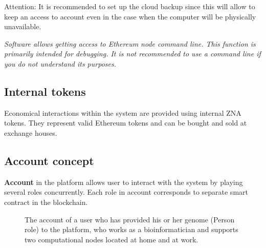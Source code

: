 \begin{note}
  Attention: It is recommended to set up the cloud backup since this will allow to keep an access to account even in the case when the computer will be physically unavailable.
\end{note}

\begin{note} \it
Software allows getting access to Ethereum node command line. This function is primarily intended for debugging. It is not recommended to use a command line if you do not understand its purposes.
\end{note}

\subsection{Internal tokens}
Economical interactions within the system are provided using internal ZNA tokens. They represent valid Ethereum tokens and can be bought and sold at exchange houses.

\subsection{Account concept}
\textbf{Account} in the platform allows user to interact with the system by playing several roles concurrently. Each role in account corresponds to separate smart contract in the blockchain.


\begin{figure}[H] \centering

  \caption{The account of a user who has provided his or her genome (Person role) to the platform, who works as a bioinformatician and supports two computational nodes located at home and at work.}
\end{figure}


